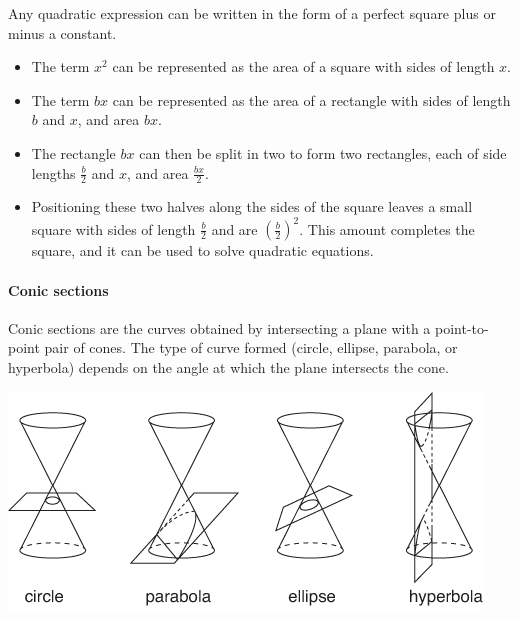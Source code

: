 \documentclass[12pt]{article}
\begin{document}
Any quadratic expression can be written in the form of a perfect square plus or minus a constant.
\begin{itemize}
\item The term $x^2$ can be represented as the area of a square with sides of length $x$.
\item The term $bx$ can be represented as the area of a rectangle with sides of length $b$ and $x$, and area $bx$.
\item The rectangle $bx$ can then be split in two to form two rectangles, each of side lengths $\frac{b}{2}$ and $x$, and area $\frac{bx}{2}$.
\item Positioning these two halves along the sides of the square leaves a small square with sides of length $\frac{b}{2}$ and are $(\frac{b}{2})^2$. This amount completes the square, and it can be used to solve quadratic equations.
\end{itemize}
\begin{center}
\end{center}

\paragraph{Conic sections}
Conic sections are the curves obtained by intersecting a plane with a point-to-point pair of cones. The type of curve formed (circle, ellipse, parabola, or hyperbola) depends on the angle at which the plane intersects the cone.

\begin{center}
\includegraphics[width=\textwidth]{conic sections.png}
\end{center}
\end{document}
